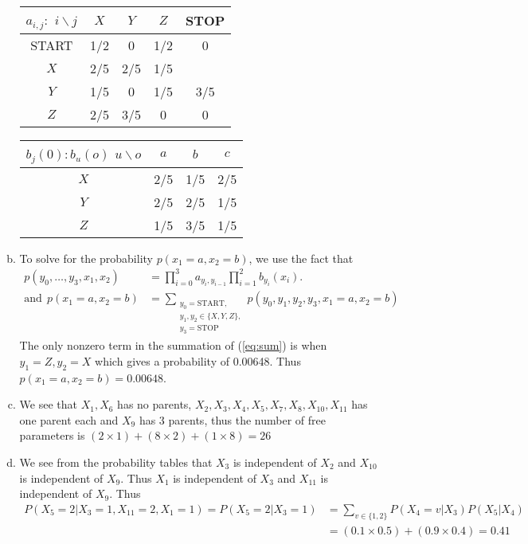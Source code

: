 \documentclass[a4paper,10pt]{article}
\theoremstyle{definition}
\begin{document}
\begin{enumerate}
\begin{enumerate}[(a)]
\begin{table}[h]
\begin{tabular}{c|c|c|c|c}
 $a_{i,j}:$ $i \backslash j$ &$X$ & $Y$ & $Z$ & STOP\\
 \hline
 START & 1/2 &0&1/2&0\\
\hline
$X$ &2/5 & 2/5& 1/5\\
\hline
$Y$&1/5 &0 & 1/5 & 3/5 \\
\hline
$Z$ &2/5 &3/5 & 0 & 0\\
\hline
\end{tabular}
\qquad
\begin{tabular}{c|c|c|c}
$b_j(0):$$b_u(o)$ $u \backslash o$ &$a$ & $b$ & $c$\\
\hline
$X$ &2/5 & 1/5& 2/5\\
\hline
$Y$&2/5 &2/5 & 1/5 \\
\hline
$Z$ &1/5 &3/5 & 1/5\\
\hline
\end{tabular}

\end{table}

\item To solve for the probability $p(x_1=a, x_2=b)$, we use the fact that 
\begin{align}
p(y_0,\ldots, y_3,x_1,x_2) &= \prod_{i=0}^{3}a_{y_i,y_{i-1}}\prod_{i=1}^{2}b_{y_i}(x_i)\nonumber.\\ 
\text{and}~~ p(x_1=a, x_2=b) &= \sum_{\substack{y_0=\text{START},\\y_1,y_2 \in \{X,Y,Z\},\\y_3=\text{STOP}}}p(y_0,y_1,y_2, y_3,x_1=a,x_2=b) \label{eq:sum}
\end{align}
The only nonzero term in the summation of (\ref{eq:sum}) is when $y_1=Z, y_2=X$ which gives a probability of 0.00648. Thus $p(x_1=a, x_2=b)=0.00648$.
\item 
We see that $X_1, X_6$ has no parents, $X_2,X_3,X_4,X_5,X_7,X_8,X_{10},X_{11}$ has one parent each and $X_9$ has 3 parents, thus the number of free parameters is $(2 \times 1) + (8\times 2) + (1 \times 8)=26$


\item We see from the probability tables that $X_3$ is independent of $X_2$ and $X_{10}$ is independent of $X_9$. Thus $X_1$ is independent of $X_3$ and $X_{11}$ is independent of $X_9$. Thus 
\begin{align*}
P(X_5 = 2 | X_3 =1, X_{11}=2, X_1 = 1) = P(X_5=2|X_3=1)&=\sum_{v\in \{1,2\}}P(X_4=v|X_3)P(X_5|X_4)\\
&=(0.1 \times 0.5)  + (0.9\times 0.4) = 0.41
\end{align*}
\end{enumerate}

\end{enumerate}
\end{document}
